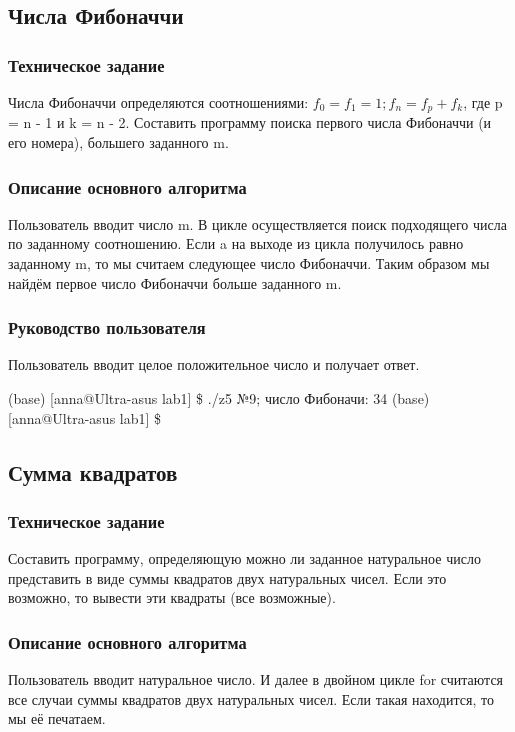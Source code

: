 \documentclass[a4paper,12pt]{extarticle}
\begin{document}
\subsection{Числа Фибоначчи}
\subsubsection{Техническое задание}
Числа  Фибоначчи  определяются  соотношениями: $f_0=f_1=1;f_n={f_p}+{f_k}$, где p = n - 1 и k = n - 2. Составить программу  поиска первого числа  Фибоначчи  (и  его  номера),  большего заданного m.
\subsubsection{Описание основного алгоритма}
Пользователь вводит число m. В цикле осуществляется поиск подходящего числа по заданному соотношению. Если a на выходе из цикла получилось равно заданному m, то мы считаем следующее число Фибоначчи. Таким образом мы найдём первое число Фибоначчи больше заданного m.

\subsubsection{Руководство пользователя}
Пользователь вводит целое положительное число и получает ответ.

(base) [anna@Ultra-asus lab1] \$ ./z5 \newline
№9; число Фибоначи: 34\newline
(base) [anna@Ultra-asus lab1] \$ \newline

\subsection{Сумма квадратов}
\subsubsection{Техническое задание}
Составить  программу,  определяющую  можно  ли  заданное  натуральное число представить в виде суммы квадратов двух натуральных чисел. Если это возможно, то вывести эти квадраты (все возможные).

\subsubsection{Описание основного алгоритма}
Пользователь вводит натуральное число. И далее в двойном цикле for считаются все случаи суммы квадратов двух натуральных чисел. Если такая находится, то мы её печатаем.
\end{document}

